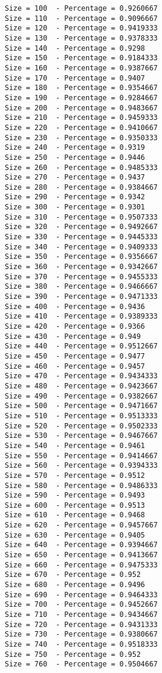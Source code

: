\documentclass[11pt]{article}
\begin{document}
    \begin{Verbatim}[commandchars=\\\{\}]
Size = 100  - Percentage = 0.9260667 
Size = 110  - Percentage = 0.9096667 
Size = 120  - Percentage = 0.9419333 
Size = 130  - Percentage = 0.9378333 
Size = 140  - Percentage = 0.9298 
Size = 150  - Percentage = 0.9184333 
Size = 160  - Percentage = 0.9387667 
Size = 170  - Percentage = 0.9407 
Size = 180  - Percentage = 0.9354667 
Size = 190  - Percentage = 0.9284667 
Size = 200  - Percentage = 0.9483667 
Size = 210  - Percentage = 0.9459333 
Size = 220  - Percentage = 0.9410667 
Size = 230  - Percentage = 0.9350333 
Size = 240  - Percentage = 0.9319 
Size = 250  - Percentage = 0.9446 
Size = 260  - Percentage = 0.9485333 
Size = 270  - Percentage = 0.9437 
Size = 280  - Percentage = 0.9384667 
Size = 290  - Percentage = 0.9342 
Size = 300  - Percentage = 0.9301 
Size = 310  - Percentage = 0.9507333 
Size = 320  - Percentage = 0.9492667 
Size = 330  - Percentage = 0.9445333 
Size = 340  - Percentage = 0.9409333 
Size = 350  - Percentage = 0.9356667 
Size = 360  - Percentage = 0.9342667 
Size = 370  - Percentage = 0.9455333 
Size = 380  - Percentage = 0.9466667 
Size = 390  - Percentage = 0.9471333 
Size = 400  - Percentage = 0.9436 
Size = 410  - Percentage = 0.9389333 
Size = 420  - Percentage = 0.9366 
Size = 430  - Percentage = 0.949 
Size = 440  - Percentage = 0.9512667 
Size = 450  - Percentage = 0.9477 
Size = 460  - Percentage = 0.9457 
Size = 470  - Percentage = 0.9434333 
Size = 480  - Percentage = 0.9423667 
Size = 490  - Percentage = 0.9382667 
Size = 500  - Percentage = 0.9471667 
Size = 510  - Percentage = 0.9513333 
Size = 520  - Percentage = 0.9502333 
Size = 530  - Percentage = 0.9467667 
Size = 540  - Percentage = 0.9461 
Size = 550  - Percentage = 0.9414667 
Size = 560  - Percentage = 0.9394333 
Size = 570  - Percentage = 0.9512 
Size = 580  - Percentage = 0.9486333 
Size = 590  - Percentage = 0.9493 
Size = 600  - Percentage = 0.9513 
Size = 610  - Percentage = 0.9468 
Size = 620  - Percentage = 0.9457667 
Size = 630  - Percentage = 0.9405 
Size = 640  - Percentage = 0.9394667 
Size = 650  - Percentage = 0.9413667 
Size = 660  - Percentage = 0.9475333 
Size = 670  - Percentage = 0.952 
Size = 680  - Percentage = 0.9496 
Size = 690  - Percentage = 0.9464333 
Size = 700  - Percentage = 0.9452667 
Size = 710  - Percentage = 0.9434667 
Size = 720  - Percentage = 0.9431333 
Size = 730  - Percentage = 0.9380667 
Size = 740  - Percentage = 0.9518333 
Size = 750  - Percentage = 0.952 
Size = 760  - Percentage = 0.9504667 

\end{Verbatim}
\end{document}

